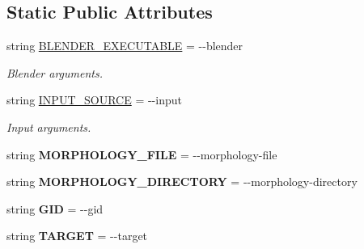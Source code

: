 \subsection*{Static Public Attributes}
\begin{DoxyCompactItemize}
\item 
string \hyperlink{classmeshy_1_1neuromorphovis_1_1interface_1_1cli_1_1args_1_1Args_a1bc4d304b9344e98943d0816510b469d}{B\+L\+E\+N\+D\+E\+R\+\_\+\+E\+X\+E\+C\+U\+T\+A\+B\+LE} = \textquotesingle{}-\/-\/blender\textquotesingle{}
\begin{DoxyCompactList}\small\item\em Blender arguments. \end{DoxyCompactList}\item 
string \hyperlink{classmeshy_1_1neuromorphovis_1_1interface_1_1cli_1_1args_1_1Args_a79b4ea4d17d61babef2dfcd36d994c7e}{I\+N\+P\+U\+T\+\_\+\+S\+O\+U\+R\+CE} = \textquotesingle{}-\/-\/input\textquotesingle{}
\begin{DoxyCompactList}\small\item\em Input arguments. \end{DoxyCompactList}\item 
string {\bfseries M\+O\+R\+P\+H\+O\+L\+O\+G\+Y\+\_\+\+F\+I\+LE} = \textquotesingle{}-\/-\/morphology-\/file\textquotesingle{}\hypertarget{classmeshy_1_1neuromorphovis_1_1interface_1_1cli_1_1args_1_1Args_a1e270142c47b40e03262ffcc92721644}{}\label{classmeshy_1_1neuromorphovis_1_1interface_1_1cli_1_1args_1_1Args_a1e270142c47b40e03262ffcc92721644}

\item 
string {\bfseries M\+O\+R\+P\+H\+O\+L\+O\+G\+Y\+\_\+\+D\+I\+R\+E\+C\+T\+O\+RY} = \textquotesingle{}-\/-\/morphology-\/directory\textquotesingle{}\hypertarget{classmeshy_1_1neuromorphovis_1_1interface_1_1cli_1_1args_1_1Args_a2996b840b3c151e6b575a4d40473c3dc}{}\label{classmeshy_1_1neuromorphovis_1_1interface_1_1cli_1_1args_1_1Args_a2996b840b3c151e6b575a4d40473c3dc}

\item 
string {\bfseries G\+ID} = \textquotesingle{}-\/-\/gid\textquotesingle{}\hypertarget{classmeshy_1_1neuromorphovis_1_1interface_1_1cli_1_1args_1_1Args_a223218f0d41dbe5a25261321903f47d6}{}\label{classmeshy_1_1neuromorphovis_1_1interface_1_1cli_1_1args_1_1Args_a223218f0d41dbe5a25261321903f47d6}

\item 
string {\bfseries T\+A\+R\+G\+ET} = \textquotesingle{}-\/-\/target\textquotesingle{}\hypertarget{classmeshy_1_1neuromorphovis_1_1interface_1_1cli_1_1args_1_1Args_ab1a14b9ef7f696c2589ff0215a090755}{}\label{classmeshy_1_1neuromorphovis_1_1interface_1_1cli_1_1args_1_1Args_ab1a14b9ef7f696c2589ff0215a090755}


\end{DoxyCompactItemize}
